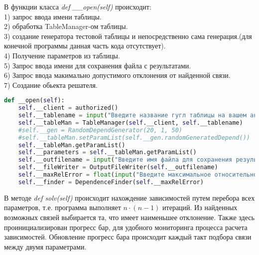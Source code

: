     В функции класса \textit{def \_\_open(self)} происходит:\\
    1) запрос ввода имени таблицы.\\
    2) обработка TableManager-ом таблицы.\\
    3) создание генератора тестовой таблицы и непосредственно сама генерация.(для конечной программы данная часть кода отсутствует).\\
    4) Получение параметров из таблицы.\\
    5) Запрос ввода имени для сохранения файла с результатами.\\
    6) Запрос ввода макимально допустимого отклонения от найденной связи.\\
    7) Создание обьекта решателя.\\

    \begin{lstlisting}[language=Python]
def __open(self):
    self.__client = authorized()
    self.__tablename = input("Введите название гугл таблицы на вашем аккаунте или url адрес доступной таблицы: ")
    self.__tableMan = TableManager(self.__client, self.__tablename)
    #self.__gen = RandomDependGenerator(20, 1, 50)
    #self.__tableMan.setParamList(self.__gen.randomGeneratedDepend())
    self.__tableMan.getParamList()
    self.__parameters = self.__tableMan.getParamList()
    self.__outfilename = input("Введите имя файла для сохранения результатов: ")
    self.__fileWriter = OutputFileWriter(self.__outfilename)
    self.__maxRelError = float(input("Введите максимальное относительное отклонение в процентах от зависимости: "))/100.0
    self.__finder = DependenceFinder(self.__maxRelError)
    \end{lstlisting}

    В методе \textit{def solv(self)} происходит нахождение зависимостей путем перебора всех параметров, т.е. программа выполняет $n\cdot (n-1)$ итераций. Из найденных возможных связей выбирается та, что имеет наименьшее отклонение. Также здесь проинициализирован прогресс бар, для удобного мониторинга процесса расчета зависимостей.
    Обновление прогресс бара происходит каждый такт подбора связи между двумя параметрами.

